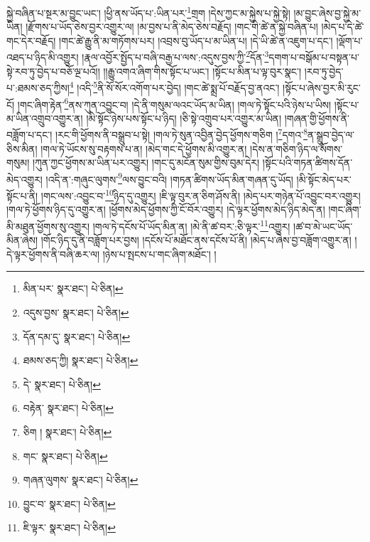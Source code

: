 སྐྱེ་བཞིན་པ་སྔར་མ་བྱུང་ཡང་། །ཕྱི་ནས་ཡོད་པ་:ཡིན་པར་\footnote{མིན་པར་  སྣར་ཐང་།  པེ་ཅིན། }གྲག །དེས་ཀྱང་མ་སྐྱེས་པ་སྐྱེ་སྟེ། །མ་བྱུང་ཞེས་བྱ་སྐྱེ་མ་ཡིན། །རྫོགས་པ་ཡོད་ཅེས་བྱར་འགྱུར་ལ། །མ་བྱས་པ་ནི་མེད་ཅེས་བརྗོད། །གང་གི་ཚེ་ན་སྐྱེ་བཞིན་པ། །མེད་པ་དེ་ཚེ་གང་དེར་བརྗོད། །གང་ཚེ་རྒྱུ་ནི་མ་གཏོགས་པར། །འབྲས་བུ་ཡོད་པ་མ་ཡིན་པ། །དེ་ཡི་ཚེ་ན་འཇུག་པ་དང་། །ལྡོག་པ་འཐད་པ་ཉིད་མི་འགྱུར། །རྣལ་འབྱོར་སྤྱོད་པ་བཞི་བརྒྱ་པ་ལས་:འདུས་བྱས་ཀྱི་\footnote{འདུས་བྱས་  སྣར་ཐང་།  པེ་ཅིན། }དོན་\footnote{དོན་དམ་དུ་  སྣར་ཐང་།  པེ་ཅིན། }དགག་པ་བསྒོམ་པ་བསྟན་པ་སྟེ་རབ་ཏུ་བྱེད་པ་བཅོ་ལྔ་པའོ།། །།རྒྱུ་འགའ་ཞིག་གིས་སྟོང་པ་ཡང་། །སྟོང་པ་མིན་པ་ལྟ་བུར་སྣང་། །རབ་ཏུ་བྱེད་པ་:ཐམས་ཅད་ཀྱིས།\footnote{ཐམས་ཅད་ཀྱི།  སྣར་ཐང་།  པེ་ཅིན། } །འདི་\footnote{དེ་  སྣར་ཐང་།  པེ་ཅིན། }ནི་སོ་སོར་འགོག་པར་བྱེད། །གང་ཚེ་སྨྲ་པོ་བརྗོད་བྱ་ནའང་། །སྟོང་པ་ཞེས་བྱར་མི་རུང་ངོ། །གང་ཞིག་རྟེན་\footnote{བརྟེན་  སྣར་ཐང་།  པེ་ཅིན། }ནས་ཀུན་འབྱུང་བ། །དེ་ནི་གསུམ་ལའང་ཡོད་མ་ཡིན། །གལ་ཏེ་སྟོང་པའི་ཉེས་པ་ཡིས། །སྟོང་པ་མ་ཡིན་འགྲུབ་འགྱུར་ན། །མི་སྟོང་ཉེས་པས་སྟོང་པ་ཉིད། །ཅི་སྟེ་འགྲུབ་པར་འགྱུར་མ་ཡིན། །གཞན་གྱི་ཕྱོགས་ནི་བཟློག་པ་དང་། །རང་གི་ཕྱོགས་ནི་བསྒྲུབ་པ་སྟེ། །གལ་ཏེ་སུན་འབྱིན་བྱེད་ཕྱོགས་གཅིག །\footnote{ཅིག །  སྣར་ཐང་།  པེ་ཅིན། }དགའ་\footnote{གང་  སྣར་ཐང་།  པེ་ཅིན། }ན་སྒྲུབ་བྱེད་ལ་ཅིས་མིན། །གལ་ཏེ་ཡོངས་སུ་བརྟགས་པ་ན། །མེད་གང་དེ་ཕྱོགས་མི་འགྱུར་ན། །དེས་ན་གཅིག་ཉིད་ལ་སོགས་གསུམ། །ཀུན་ཀྱང་ཕྱོགས་མ་ཡིན་པར་འགྱུར། །གང་དུ་མངོན་སུམ་གྱིས་བུམ་དེར། །སྟོང་པའི་གཏན་ཚིགས་དོན་མེད་འགྱུར། །འདི་ན་:གཞུང་ལུགས་\footnote{གཞན་ལུགས་  སྣར་ཐང་།  པེ་ཅིན། }ལས་བྱུང་བའི། །གཏན་ཚིགས་ཡོད་མིན་གཞན་དུ་ཡོད། །མི་སྟོང་མེད་པར་སྟོང་པ་ནི། །གང་ལས་:འབྱུང་བ་\footnote{བྱུང་བ་  སྣར་ཐང་།  པེ་ཅིན། }ཉིད་དུ་འགྱུར། །ཇི་ལྟ་བུར་ན་ཅིག་ཤོས་ནི། །མེད་པར་གཉེན་པོ་འབྱུང་བར་འགྱུར། །གལ་ཏེ་ཕྱོགས་ཉིད་དུ་འགྱུར་ན། །ཕྱོགས་མེད་ཕྱོགས་ཀྱི་ངོ་བོར་འགྱུར། །དེ་ལྟར་ཕྱོགས་མེད་ཉིད་མེད་ན། །གང་ཞིག་མི་མཐུན་ཕྱོགས་སུ་འགྱུར། །གལ་ཏེ་དངོས་པོ་ཡོད་མིན་ན། །མེ་ནི་ཚ་བར་:ཅི་ལྟར་\footnote{ཇི་ལྟར་  སྣར་ཐང་།  པེ་ཅིན། }འགྱུར། །ཚ་བ་མེ་ཡང་ཡོད་མིན་ཞེས། །གོང་ཉིད་དུ་ནི་བཟློག་པར་བྱས། །དངོས་པོ་མཐོང་ནས་དངོས་པོ་ནི། །མེད་པ་ཞེས་བྱ་བཟློག་འགྱུར་ན། །དེ་ལྟར་ཕྱོགས་ནི་བཞི་ཆར་ལ། །ཉེས་པ་སྤངས་པ་གང་ཞིག་མཐོང་། །
